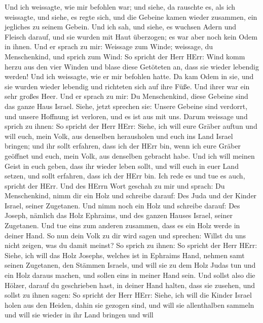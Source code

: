  Und ich weissagte, wie mir befohlen war; und siehe, da
rauschte es, als ich weissagte, und siehe, es regte sich, und die
Gebeine kamen wieder zusammen, ein jegliches zu seinem Gebein.
 Und ich sah, und siehe, es wuchsen Adern und Fleisch
darauf, und sie wurden mit Haut überzogen; es war aber noch kein Odem in
ihnen.  Und er sprach zu mir: Weissage zum Winde; weissage,
du Menschenkind, und sprich zum Wind: So spricht der Herr HErr: Wind
komm herzu aus den vier Winden und blase diese Getöteten an, dass sie
wieder lebendig werden!  Und ich weissagte, wie er mir
befohlen hatte. Da kam Odem in sie, und sie wurden wieder lebendig und
richteten sich auf ihre Füße. Und ihrer war ein sehr großes Heer.
 Und er sprach zu mir: Du Menschenkind, diese Gebeine sind
das ganze Haus Israel. Siehe, jetzt sprechen sie: Unsere Gebeine sind
verdorrt, und unsere Hoffnung ist verloren, und es ist aus mit uns.
 Darum weissage und sprich zu ihnen: So spricht der Herr
HErr: Siehe, ich will eure Gräber auftun und will euch, mein Volk, aus
denselben herausholen und euch ins Land Israel bringen; 
und ihr sollt erfahren, dass ich der HErr bin, wenn ich eure Gräber
geöffnet und euch, mein Volk, aus denselben gebracht habe. 
Und ich will meinen Geist in euch geben, dass ihr wieder leben sollt,
und will euch in euer Land setzen, und sollt erfahren, dass ich der HErr
bin. Ich rede es und tue es auch, spricht der HErr.  Und
des HErrn Wort geschah zu mir und sprach:  Du Menschenkind,
nimm dir ein Holz und schreibe darauf: Des Juda und der Kinder Israel,
seiner Zugetanen. Und nimm noch ein Holz und schreibe darauf: Des
Joseph, nämlich das Holz Ephraims, und des ganzen Hauses Israel, seiner
Zugetanen.  Und tue eins zum anderen zusammen, dass es ein
Holz werde in deiner Hand.  So nun dein Volk zu dir wird
sagen und sprechen: Willst du uns nicht zeigen, was du damit meinst?
 So sprich zu ihnen: So spricht der Herr HErr: Siehe, ich
will das Holz Josephs, welches ist in Ephraims Hand, nehmen samt seinen
Zugetanen, den Stämmen Israels, und will sie zu dem Holz Judas tun und
ein Holz daraus machen, und sollen eins in meiner Hand sein.
 Und sollst also die Hölzer, darauf du geschrieben hast, in
deiner Hand halten, dass sie zusehen,  und sollst zu ihnen
sagen: So spricht der Herr HErr: Siehe, ich will die Kinder Israel holen
aus den Heiden, dahin sie gezogen sind, und will sie allenthalben
sammeln und will sie wieder in ihr Land bringen  und will
